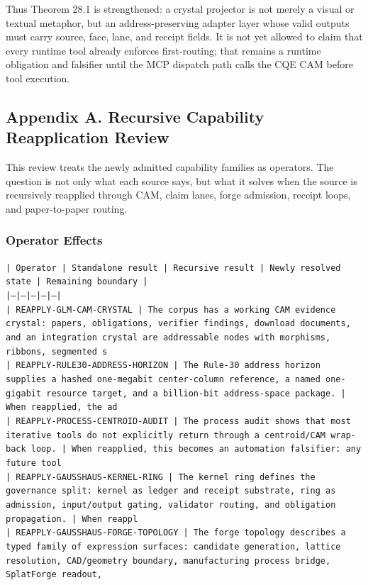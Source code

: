 \documentclass[11pt]{article}
\begin{document}
Thus Theorem 28.1 is strengthened: a crystal projector is not merely a visual or
textual metaphor, but an address-preserving adapter layer whose valid outputs
must carry source, face, lane, and receipt fields. It is not yet allowed to
claim that every runtime tool already enforces first-routing; that remains a
runtime obligation and falsifier until the MCP dispatch path calls the CQE CAM
before tool execution.

\subsection*{Appendix A. Recursive Capability Reapplication Review}

This review treats the newly admitted capability families as operators. The question is not only what each source says, but what it solves when the source is recursively reapplied through CAM, claim lanes, forge admission, receipt loops, and paper-to-paper routing.

\subsubsection*{Operator Effects}

\noindent\texttt{| Operator | Standalone result | Recursive result | Newly resolved state | Remaining boundary |}\\
\noindent\texttt{|---|---|---|---|---|}\\
\noindent\texttt{| REAPPLY-GLM-CAM-CRYSTAL | The corpus has a working CAM evidence crystal: papers, obligations, verifier findings, download documents, and an integration crystal are addressable nodes with morphisms, ribbons, segmented s}\\
\noindent\texttt{| REAPPLY-RULE30-ADDRESS-HORIZON | The Rule-30 address horizon supplies a hashed one-megabit center-column reference, a named one-gigabit resource target, and a billion-bit address-space package. | When reapplied, the ad}\\
\noindent\texttt{| REAPPLY-PROCESS-CENTROID-AUDIT | The process audit shows that most iterative tools do not explicitly return through a centroid/CAM wrap-back loop. | When reapplied, this becomes an automation falsifier: any future tool}\\
\noindent\texttt{| REAPPLY-GAUSSHAUS-KERNEL-RING | The kernel ring defines the governance split: kernel as ledger and receipt substrate, ring as admission, input/output gating, validator routing, and obligation propagation. | When reappl}\\
\noindent\texttt{| REAPPLY-GAUSSHAUS-FORGE-TOPOLOGY | The forge topology describes a typed family of expression surfaces: candidate generation, lattice resolution, CAD/geometry boundary, manufacturing process bridge, SplatForge readout, }\\
\end{document}
